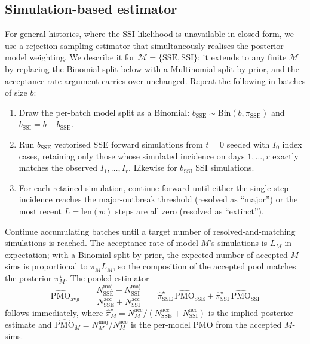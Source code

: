 \documentclass{article}
\theoremstyle{definition}
\begin{document}
\subsection{Simulation-based estimator}
\label{sec:simulation}

For general histories, where the SSI likelihood is unavailable in closed
form, we use a rejection-sampling estimator that simultaneously realises
the posterior model weighting.  We describe it for
$\mathcal{M} = \{\mathrm{SSE}, \mathrm{SSI}\}$; it extends to any finite
$\mathcal{M}$ by replacing the Binomial split below with a Multinomial
split by prior, and the acceptance-rate argument carries over unchanged.
Repeat the following in batches of size $b$:

\begin{enumerate}
  \item Draw the per-batch model split as a Binomial:
    $b_\mathrm{SSE} \sim \mathrm{Bin}(b, \pi_\mathrm{SSE})$ and
    $b_\mathrm{SSI} = b - b_\mathrm{SSE}$.
  \item Run $b_\mathrm{SSE}$ vectorised SSE forward simulations from $t=0$
    seeded with $I_0$ index cases, retaining only those whose simulated
    incidence on days $1, \ldots, r$ exactly matches the observed
    $I_1, \ldots, I_r$.  Likewise for $b_\mathrm{SSI}$ SSI simulations.
  \item For each retained simulation, continue forward until either the
    single-step incidence reaches the major-outbreak threshold (resolved as
    ``major'') or the most recent $L = \mathrm{len}(w)$ steps are all zero
    (resolved as ``extinct'').
\end{enumerate}

Continue accumulating batches until a target number of resolved-and-matching
simulations is reached.  The acceptance rate of model $M$'s simulations is
$L_M$ in expectation; with a Binomial split by prior, the expected number
of accepted $M$-sims is proportional to $\pi_M L_M$, so the composition of
the accepted pool matches the posterior $\pi_M^\star$.  The pooled estimator
\begin{equation}
  \widehat{\mathrm{PMO}}_\mathrm{avg}
  \;=\; \frac{N_\mathrm{SSE}^{\mathrm{maj}} + N_\mathrm{SSI}^{\mathrm{maj}}}
  {N_\mathrm{SSE}^{\mathrm{acc}} + N_\mathrm{SSI}^{\mathrm{acc}}}
  \;=\; \widehat{\pi}_\mathrm{SSE}^\star\,\widehat{\mathrm{PMO}}_\mathrm{SSE}
  + \widehat{\pi}_\mathrm{SSI}^\star\,\widehat{\mathrm{PMO}}_\mathrm{SSI}
\end{equation}
follows immediately, where $\widehat{\pi}_M^\star = N_M^{\mathrm{acc}} /
(N_\mathrm{SSE}^{\mathrm{acc}} + N_\mathrm{SSI}^{\mathrm{acc}})$ is the
implied posterior estimate and $\widehat{\mathrm{PMO}}_M = N_M^{\mathrm{maj}}
/ N_M^{\mathrm{acc}}$ is the per-model PMO from the accepted $M$-sims.
\end{document}
